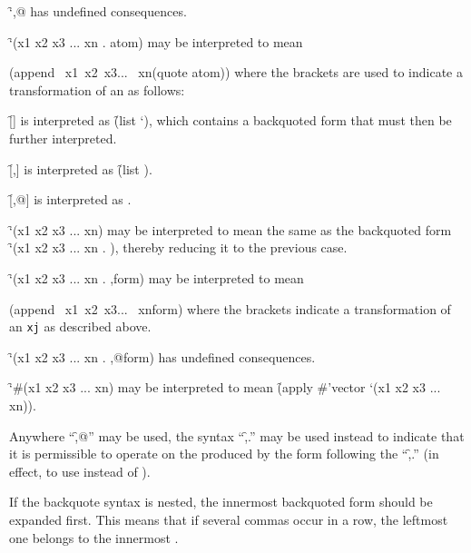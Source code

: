 \itemitem{\bull}
\f{`,@} has undefined consequences.

\itemitem{\bull}
\f{`(x1 x2 x3 ... xn . atom)}
may be interpreted to mean

\code
 (append \lbracket\ x1\rbracket \lbracket\ x2\rbracket \lbracket\ x3\rbracket ... \lbracket\ xn\rbracket (quote atom))
\endcode
where the brackets are used to indicate
a transformation of an  as follows:

\beginlist
\itemitem{--}
\f{[]} is interpreted as \f{(list `)}, 
which contains a backquoted form that must then be further interpreted.

\itemitem{--}
\f{[,]} is interpreted as \f{(list )}.

\itemitem{--}
\f{[,@]} is interpreted as .
\endlist

\itemitem{\bull}
\f{`(x1 x2 x3 ... xn)} may be interpreted to mean
the same as the backquoted form
\f{`(x1 x2 x3 ... xn . \nil)},
thereby reducing it to the previous case.

\itemitem{\bull}
\f{`(x1 x2 x3 ... xn . ,form)} may be interpreted to mean

\code
 (append \lbracket\ x1\rbracket \lbracket\ x2\rbracket \lbracket\ x3\rbracket ... \lbracket\ xn\rbracket form)
\endcode
where the brackets indicate a transformation of an {\tt xj} as described above.

\itemitem{\bull}
\f{`(x1 x2 x3 ... xn . ,@form)} has undefined consequences.

\itemitem{\bull}
\f{`\#(x1 x2 x3 ... xn)} may be interpreted to mean
\f{(apply \#'vector `(x1 x2 x3 ... xn))}.
\endlist


Anywhere ``\f{,@}'' may be used, the syntax ``\f{,.}'' may be used instead
to indicate that it is permissible to operate  on 
the   produced by the form following the ``\f{,.}'' 
(in effect, to use  instead of ).

If the backquote syntax is nested, the innermost backquoted form
should be expanded first.  This means that if several commas occur
in a row, the leftmost one belongs to the innermost .


